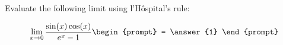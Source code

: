 \documentclass{ximera}
\author{Steven Gubkin}
\begin{document}
\begin{exercise}

Evaluate the following limit using l'H\^{o}spital's rule:

\[
\lim_{x \to 0} \frac{\sin(x)\cos(x)}{e^x - 1} \begin{prompt} = \answer{1}
\end{prompt}
\]

\end{exercise}
\end{document}
